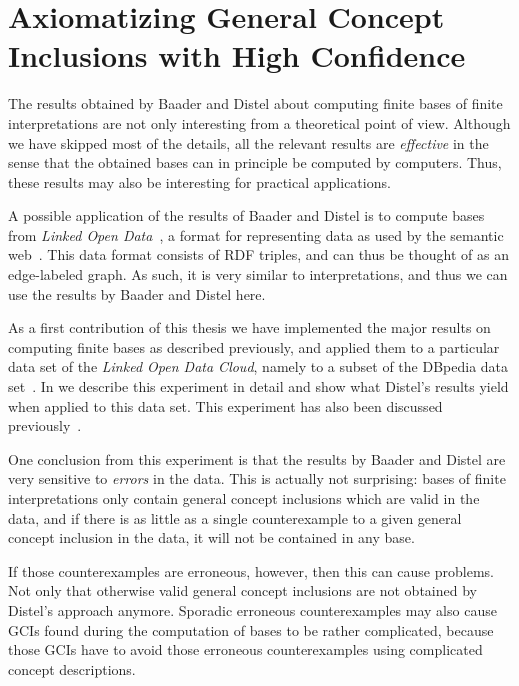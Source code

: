 \chapter{Axiomatizing General Concept Inclusions with High Confidence}
\label{cha:axiom-conf-el}

The results obtained by Baader and Distel about computing finite bases of finite
interpretations are not only interesting from a theoretical point of view.  Although we
have skipped most of the details, all the relevant results are \emph{effective} in the
sense that the obtained bases can in principle be computed by computers.  Thus, these
results may also be interesting for practical applications.

A possible application of the results of Baader and Distel is to compute bases from
\emph{Linked Open Data}~\cite{Linked-Data}, a format for representing data as used by the
semantic web~\cite{journal/sciam/BernersLeeHL01,DBLP:conf/dagstuhl/2003sweb,FOST}.  This
data format consists of RDF triples, and can thus be thought of as an edge-labeled graph.
As such, it is very similar to interpretations, and thus we can use the results by Baader
and Distel here.

As a first contribution of this thesis we have implemented the major results on computing
finite bases as described previously, and applied them to a particular data set of the
\emph{Linked Open Data Cloud}, namely to a subset of the DBpedia data set~\cite{DBpedia}.
In  we describe this experiment in detail and show what
Distel's results yield when applied to this data set.  This experiment has also been
discussed previously~\cite{Borchmann:confident-GCIs,DBLP:conf/icdm/BorchmannD11}.

One conclusion from this experiment is that the results by Baader and Distel are very
sensitive to \emph{errors} in the data.  This is actually not surprising: bases of finite
interpretations only contain general concept inclusions which are valid in the data, and
if there is as little as a single counterexample to a given general concept inclusion in
the data, it will not be contained in any base.

If those counterexamples are erroneous, however, then this can cause problems.  Not only
that otherwise valid general concept inclusions are not obtained by Distel's approach
anymore.  Sporadic erroneous counterexamples may also cause GCIs found during the
computation of bases to be rather complicated, because those GCIs have to avoid those
erroneous counterexamples using complicated concept descriptions.


